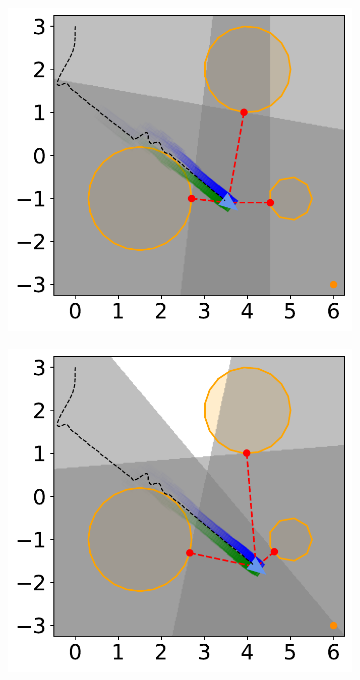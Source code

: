\begin{figure}[H]
    \begin{subfigure}{0.35\textwidth}
        \centering
        \includegraphics[width=\textwidth]{figures/Simulations/sim1circles/frame_6.pdf}
    \end{subfigure}%
    \hspace{1em}
    \begin{subfigure}{0.35\textwidth}
        \centering
        \includegraphics[width=\textwidth]{figures/Simulations/sim1circles/frame_7.pdf}
    \end{subfigure}%


\end{figure}
